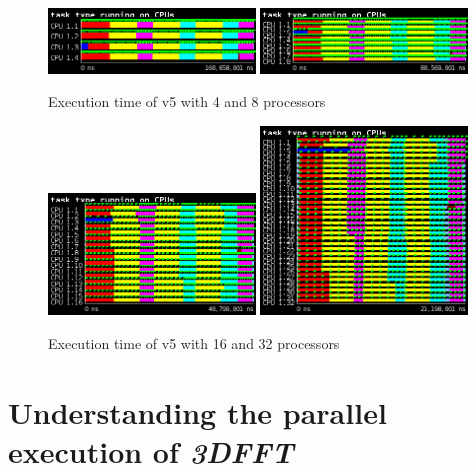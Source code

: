 \begin{figure}[H]%
    \label{fig:plot_v5_04}
    \centering
    \includegraphics[width=0.49\textwidth]{./data/3dfft_/plots/v5_04.png}
    \includegraphics[width=0.49\textwidth]{./data/3dfft_/plots/v5_08.png}
    \caption{Execution time of v5 with 4 and 8 processors}%
\end{figure}

\begin{figure}[H]%
    \label{fig:plot_v5_16}
    \centering
    \includegraphics[width=0.49\textwidth]{./data/3dfft_/plots/v5_16.png}
    \includegraphics[width=0.49\textwidth]{./data/3dfft_/plots/v5_32.png}
    \caption{Execution time of v5 with 16 and 32 processors}%
\end{figure}


\section{Understanding the parallel execution of \emph{3DFFT}}%
\label{sec:understanding_the_parallel_execution_of_3dfft}

